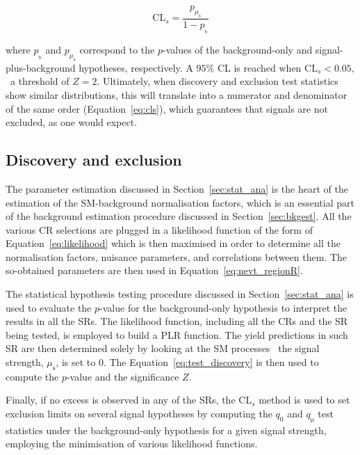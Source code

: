			\begin{equation}
				\mathrm{CL}_s = \frac{p_{\mu_{\mathrm{s}}}} {1 - p_{_\mathrm{b}}}
			\label{eq:cls}
			\end{equation}

			\noindent where $p_{_\mathrm{b}}$ and $p_{\mu_{\mathrm{s}}}$ correspond to the $p$-values of the background-only and signal-plus-background hypotheses, respectively. A $95\%$ \ac{CL} is reached when $\mathrm{CL}_s < 0.05$, \ie\ a threshold of $Z = 2$. Ultimately, when discovery and exclusion test statistics show similar distributions, this will translate into a numerator and denominator of the same order (Equation~\ref{eq:cls}), which guarantees that signals are not excluded, as one would expect.


			\subsection{Discovery and exclusion}

				The parameter estimation discussed in Section~\ref{sec:stat_ana} is the heart of the estimation of the \ac{SM}-background normalisation factors, which is an essential part of the background estimation procedure discussed in Section~\ref{sec:bkgest}. All the various \ac{CR} selections are plugged in a likelihood function of the form of Equation~\ref{eq:likelihood} which is then maximised in order to determine all the normalisation factors, nuisance parameters, and correlations between them. The so-obtained parameters are then used in Equation~\ref{eq:nevt_regionR}. 

				The statistical hypothesis testing procedure discussed in Section~\ref{sec:stat_ana} is used to evaluate the $p$-value for the background-only hypothesis to interpret the results in all the \acp{SR}. The likelihood function, including all the \acp{CR} and the \ac{SR} being tested, is employed to build a \ac{PLR} function. The yield predictions in such \ac{SR} are then determined solely by looking at the \ac{SM} processes \ie\ the signal strength, $\mu_{\mathrm{s}}$, is set to $0$. The Equation~\ref{eq:test_discovery} is then used to compute the $p$-value and the significance $Z$.%

				Finally, if no excess is observed in any of the \acp{SR}, the $\mathrm{CL}_s$ method is used to set exclusion limits on several signal hypotheses by computing the $q_0$ and $q_{\mathrm{\mu}}$ test statistics under the background-only hypothesis for a given signal strength, employing the minimisation of various likelihood functions. %



